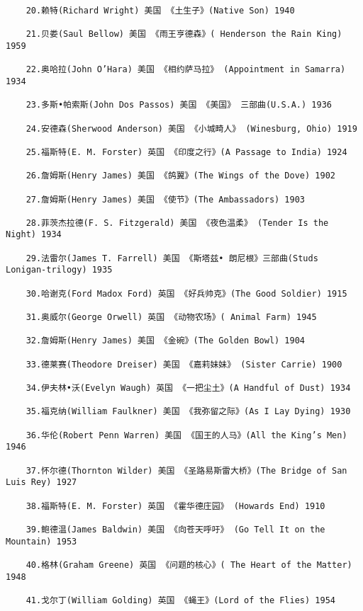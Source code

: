 \documentclass[UTF8]{../RepresentationUniverse}
\begin{document}
\begin{lstlisting}
    20.赖特(Richard Wright) 美国 《土生子》(Native Son) 1940
    
    21.贝娄(Saul Bellow) 美国 《雨王亨德森》( Henderson the Rain King) 1959
    
    22.奥哈拉(John O’Hara) 美国 《相约萨马拉》 (Appointment in Samarra) 1934
    
    23.多斯•帕索斯(John Dos Passos) 美国 《美国》 三部曲(U.S.A.) 1936
    
    24.安德森(Sherwood Anderson) 美国 《小城畸人》 (Winesburg, Ohio) 1919
    
    25.福斯特(E. M. Forster) 英国 《印度之行》(A Passage to India) 1924
    
    26.詹姆斯(Henry James) 美国 《鸽翼》(The Wings of the Dove) 1902
    
    27.詹姆斯(Henry James) 美国 《使节》(The Ambassadors) 1903
    
    28.菲茨杰拉德(F. S. Fitzgerald) 美国 《夜色温柔》 (Tender Is the Night) 1934
    
    29.法雷尔(James T. Farrell) 美国 《斯塔兹• 朗尼根》三部曲(Studs Lonigan-trilogy) 1935
    
    30.哈谢克(Ford Madox Ford) 英国 《好兵帅克》(The Good Soldier) 1915
    
    31.奥威尔(George Orwell) 英国 《动物农场》( Animal Farm) 1945
    
    32.詹姆斯(Henry James) 美国 《金碗》(The Golden Bowl) 1904
    
    33.德莱赛(Theodore Dreiser) 美国 《嘉莉妹妹》 (Sister Carrie) 1900
    
    34.伊夫林•沃(Evelyn Waugh) 英国 《一把尘土》(A Handful of Dust) 1934
    
    35.福克纳(William Faulkner) 美国 《我弥留之际》(As I Lay Dying) 1930
    
    36.华伦(Robert Penn Warren) 美国 《国王的人马》(All the King’s Men) 1946
    
    37.怀尔德(Thornton Wilder) 美国 《圣路易斯雷大桥》(The Bridge of San Luis Rey) 1927
    
    38.福斯特(E. M. Forster) 英国 《霍华德庄园》 (Howards End) 1910
    
    39.鲍德温(James Baldwin) 美国 《向苍天呼吁》 (Go Tell It on the Mountain) 1953
    
    40.格林(Graham Greene) 英国 《问题的核心》( The Heart of the Matter) 1948
    
    41.戈尔丁(William Golding) 英国 《蝇王》(Lord of the Flies) 1954
    

\end{lstlisting}
\end{document}
